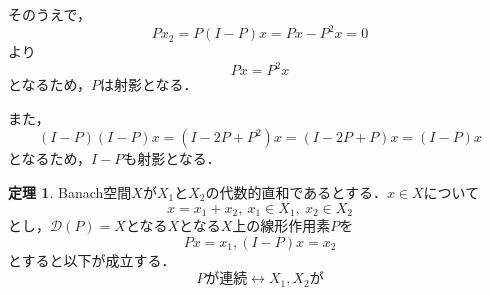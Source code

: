 \documentclass[11pt,a4paper]{jsarticle}
\theoremstyle{definition}
\newtheorem{thm}{定理}
\begin{document}
そのうえで，
\begin{equation*}
  Px_2 = P(I-P)x = Px - P^2x = 0
\end{equation*}
より
\begin{equation*}
  Px = P^2x
\end{equation*}
となるため，$P$は射影となる．

また，
\begin{equation*}
  (I-P)(I-P)x = (I-2P+P^2)x = (I - 2P + P)x = (I-P)x
\end{equation*}
となるため，$I-P$も射影となる．

\begin{thm}
  Banach空間$X$が$X_1$と$X_2$の代数的直和であるとする．$x \in X$について
  \begin{equation*}
    x = x_1 + x_2,\ x_1 \in X_1,\ x_2\in X_2
  \end{equation*}
  とし，$\mathcal{D}(P)=X$となる$X$となる$X$上の線形作用素$P$を
  \begin{equation*}
    Px = x_1, (I-P)x = x_2
  \end{equation*}
  とすると以下が成立する．
  \begin{equation*}
    Pが連続 \leftrightarrow X_1, X_2 が
  \end{equation*}
\end{thm}




\begin{comment}
\mathcal{L}(X,Y)
点列$(A_n)$
\\
&
\end{comment}


\end{document}
